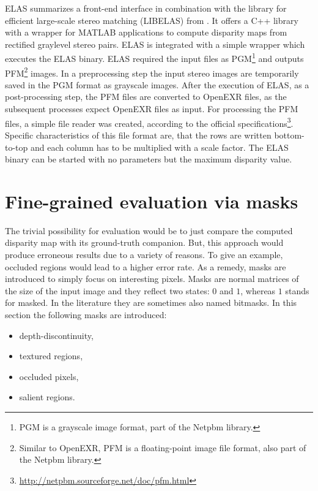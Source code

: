 ELAS summarizes a front-end interface in combination with the library for efficient large-scale stereo matching (LIBELAS) from \citeauthor{Geiger2010ACCV} \citep{Geiger2010ACCV, Geiger2011IV}.
It offers a C++ library with a wrapper for MATLAB applications to compute disparity maps from rectified graylevel stereo pairs.
ELAS is integrated with a simple wrapper which executes the ELAS binary.
ELAS required the input files as PGM\footnote{PGM is a grayscale image format, part of the Netpbm library.} and outputs PFM\footnote{Similar to OpenEXR, PFM is a floating-point image file format, also part of the Netpbm library.} images.
In a preprocessing step the input stereo images are temporarily saved in the PGM format as grayscale images.
After the execution of ELAS, as a post-processing step, the PFM files are converted to OpenEXR files, as the subsequent processes expect OpenEXR files as input.
For processing the PFM files, a simple file reader was created, according to the official specifications\footnote{\url{http://netpbm.sourceforge.net/doc/pfm.html}}.
Specific characteristics of this file format are, that the rows are written bottom-to-top and each column has to be multiplied with a scale factor.
The ELAS binary can be started with no parameters but the maximum disparity value.

\section{Fine-grained evaluation via masks}

The trivial possibility for evaluation would be to just compare the computed disparity map with its ground-truth companion.
But, this approach would produce erroneous results due to a variety of reasons.
To give an example, occluded regions would lead to a higher error rate.
As a remedy, masks are introduced to simply focus on interesting pixels.
Masks are normal matrices of the size of the input image and they reflect two states: $0$ and $1$, whereas $1$ stands for masked.
In the literature they are sometimes also named bitmasks.
In this section the following masks are introduced:

\begin{itemize}
  \item depth-discontinuity,
  \item textured regions,
  \item occluded pixels,
  \item salient regions.
\end{itemize}

